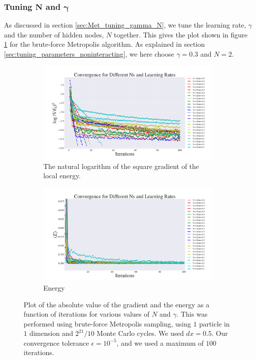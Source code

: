 \documentclass[a4paper, 10pt]{article}
\begin{document}
\subsubsection{Tuning $\boldsymbol{N}$ and $\boldsymbol{\gamma}$}
As discussed in section \ref{sec:Met_tuning_gamma_N}, we tune the learning rate, $\gamma$ and the number of hidden nodes, $N$ together. This gives the plot shown in figure \ref{fig:step_size_and_N_standard} for the brute-force Metropolis algorithm. As explained in section \ref{sec:tuning_parameters_noninteracting}, we here choose $\gamma=0.3$ and $N=2$.\\
\begin{figure}[h!]
\centering
	\begin{subfigure}{.9\textwidth}
		\centering
		\includegraphics[width=\textwidth]{../Results/grad_normal.pdf}
		\caption{The natural logarithm of the square gradient of the local energy.}
	\end{subfigure}%
	
	\begin{subfigure}{.9\textwidth}
		\centering
		\includegraphics[width=\textwidth]{../Results/energy_normal.pdf}
		\caption{Energy}
	\end{subfigure}%
\caption{Plot of the absolute value of the gradient and the energy as a function of iterations for various values of $N$ and $\gamma$. This was performed using brute-force Metropolis sampling, using $1$ particle in $1$ dimension and $2^{21}/10$ Monte Carlo cycles. We used $dx=0.5$. Our convergence tolerance $\epsilon = 10^{-5}$, and we used a maximum of $100$ iterations.}\label{fig:step_size_and_N_standard}
\end{figure}
\end{document}
